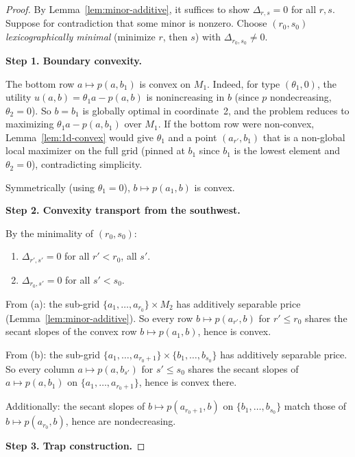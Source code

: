 \documentclass[11pt]{article}
\begin{document}
\begin{proof}
By Lemma~\ref{lem:minor-additive}, it suffices to show
$\Delta_{r,s} = 0$ for all $r, s$.  Suppose for contradiction that
some minor is nonzero.  Choose $(r_0, s_0)$ \emph{lexicographically
minimal} (minimize $r$, then $s$) with $\Delta_{r_0, s_0} \neq 0$.

\medskip\noindent
\textbf{Step 1.  Boundary convexity.}

The bottom row $a \mapsto p(a, b_1)$ is convex on $M_1$.  Indeed, for
type $(\theta_1, 0)$, the utility $u(a, b) = \theta_1 a - p(a, b)$ is
nonincreasing in $b$ (since $p$ nondecreasing, $\theta_2 = 0$).  So
$b = b_1$ is globally optimal in coordinate~2, and the problem reduces
to maximizing $\theta_1 a - p(a, b_1)$ over $M_1$.  If the bottom row
were non-convex, Lemma~\ref{lem:1d-convex} would give $\theta_1$ and
a point $(a_{r'}, b_1)$ that is a non-global local maximizer on the
full grid (pinned at $b_1$ since $b_1$ is the lowest element and
$\theta_2 = 0$), contradicting simplicity.

Symmetrically (using $\theta_1 = 0$), $b \mapsto p(a_1, b)$ is convex.

\medskip\noindent
\textbf{Step 2.  Convexity transport from the southwest.}

By the minimality of $(r_0, s_0)$:
\begin{enumerate}[label=(\alph*)]
  \item $\Delta_{r',s'} = 0$ for all $r' < r_0$, all $s'$.
  \item $\Delta_{r_0, s'} = 0$ for all $s' < s_0$.
\end{enumerate}

From (a): the sub-grid $\{a_1, \dots, a_{r_0}\} \times M_2$ has
additively separable price (Lemma~\ref{lem:minor-additive}).  So every
row $b \mapsto p(a_{r'}, b)$ for $r' \leq r_0$ shares the secant
slopes of the convex row $b \mapsto p(a_1, b)$, hence is convex.

From (b): the sub-grid $\{a_1, \dots, a_{r_0+1}\} \times
\{b_1, \dots, b_{s_0}\}$ has additively separable price.  So every
column $a \mapsto p(a, b_{s'})$ for $s' \leq s_0$ shares the secant
slopes of $a \mapsto p(a, b_1)$ on $\{a_1, \dots, a_{r_0+1}\}$, hence
is convex there.

Additionally: the secant slopes of $b \mapsto p(a_{r_0+1}, b)$ on
$\{b_1, \dots, b_{s_0}\}$ match those of $b \mapsto p(a_{r_0}, b)$,
hence are nondecreasing.

\medskip\noindent
\textbf{Step 3.  Trap construction.}


\end{proof}
\end{document}
